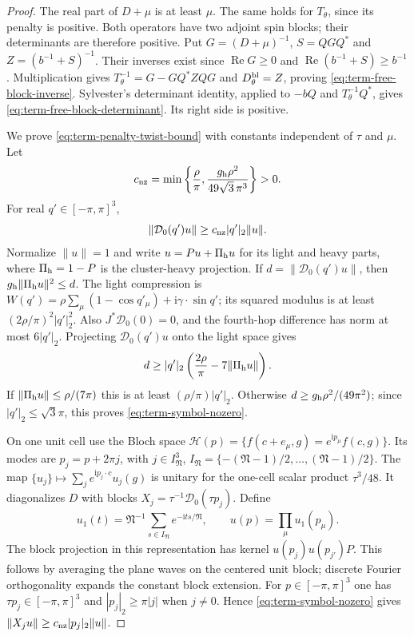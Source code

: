 \documentclass[11pt,letterpaper,reqno]{amsart}
\begin{document}
\begin{proof}
The real part of $D+\mu$ is at least $\mu$.
The same holds for $T_\theta$, since its penalty is positive.
Both operators have two adjoint spin blocks; their determinants
are therefore positive. Put $G=(D+\mu)^{-1}$,
$S=QGQ^*$ and $Z=(b^{-1}+S)^{-1}$.
Their inverses exist since $\operatorname{Re}G\ge0$ and
$\operatorname{Re}(b^{-1}+S)\ge b^{-1}$.
Multiplication gives
$T_\theta^{-1}=G-GQ^*ZQG$ and
$D_\theta^{\rm bl}=Z$, proving
\eqref{eq:term-free-block-inverse}.
Sylvester's determinant identity, applied to
$-\!bQ$ and $T_\theta^{-1}Q^*$, gives
\eqref{eq:term-free-block-determinant}. Its right side is
positive.

We prove \eqref{eq:term-penalty-twist-bound} with constants
independent of $\tau$ and $\mu$.
Let
\[
 c_{\rm nz}=\min\left\{\frac\rho\pi,
             \frac{g_{\rm h}\rho^2}{49\sqrt3\,\pi^3}\right\}>0.
\]
For real $q'\in[-\pi,\pi]^3$,
\begin{equation}\label{eq:term-symbol-nozero}
             \|\mathcal D_0(q')u\|
                         \ge c_{\rm nz}|q'|_2\|u\|.
\end{equation}
Normalize $\|u\|=1$ and
write $u=Pu+\Pi_{\rm h}u$ for its light and heavy parts,
where $\Pi_{\rm h}=1-P$ is the cluster-heavy projection.
If $d=\|\mathcal D_0(q')u\|$, then
$g_{\rm h}\|\Pi_{\rm h}u\|^2\le d$.
The light compression is
$W(q')=\rho\sum_\mu(1-\cos q'_\mu)+
\mathrm i\gamma\cdot\sin q'$; its squared modulus is
at least $(2\rho/\pi)^2|q'|_2^2$.
Also $J^*\mathcal D_0(0)=0$, and the fourth-hop
difference has norm at most $6|q'|_2$.
Projecting $\mathcal D_0(q')u$ onto the light space gives
\[
 d\ge |q'|_2\left(\frac{2\rho}{\pi}-7\|\Pi_{\rm h}u\|\right).
\]
If $\|\Pi_{\rm h}u\|\le\rho/(7\pi)$ this is at least
$(\rho/\pi)|q'|_2$. Otherwise
$d\ge g_{\rm h}\rho^2/(49\pi^2)$; since
$|q'|_2\le\sqrt3\pi$, this proves
\eqref{eq:term-symbol-nozero}.

On one unit cell use the Bloch space
$\mathcal H(p)=\{f(c+e_\mu,g)=e^{\mathrm ip_\mu}f(c,g)\}$.
Its modes are $p_j=p+2\pi j$, with
$j\in I_{\mathfrak N}^3$,
$I_{\mathfrak N}=\{-(\mathfrak N-1)/2,\ldots,
(\mathfrak N-1)/2\}$.
The map
$\{u_j\}\mapsto\sum_j e^{\mathrm ip_j\cdot c}u_j(g)$
is unitary for the one-cell scalar product $\tau^3/48$.
It diagonalizes $D$ with blocks
$X_j=\tau^{-1}\mathcal D_0(\tau p_j)$.
Define
\[
 u_1(t)=\mathfrak N^{-1}\sum_{s\in I_{\mathfrak N}}
                                      e^{-\mathrm its/\mathfrak N},
 \qquad u(p)=\prod_\mu u_1(p_\mu).
\]
The block projection in this representation has kernel
$u(p_j)u(p_{j'})P$. This follows by averaging the plane
waves on the centered unit block; discrete Fourier
orthogonality expands the constant block extension.
For $p\in[-\pi,\pi]^3$ one has $\tau p_j\in[-\pi,\pi]^3$
and $|p_j|_2\ge\pi|j|$ when $j\ne0$.
Hence \eqref{eq:term-symbol-nozero} gives
$\|X_ju\|\ge c_{\rm nz}|p_j|_2\|u\|$.


\end{proof}
\end{document}
